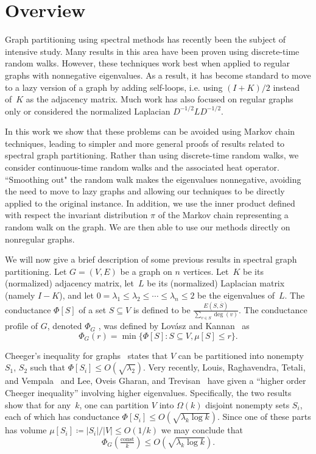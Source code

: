 \documentclass[11pt]{article}
\newcommand{\Bdry}{\Phi}
\begin{document}
\section{Overview}

Graph partitioning using spectral methods has recently been the subject of intensive study.  Many results in this area have been proven using discrete-time random walks.  However, these techniques work best when applied to regular graphs with nonnegative eigenvalues.  As a result, it has become standard to move to a lazy version of a graph by adding self-loops, i.e. using $(I + K)/2$ instead of~$K$ as the adjacency matrix.  Much work has also focused on regular graphs only or considered the normalized Laplacian $D^{-1/2}LD^{-1/2}$.

In this work we show that these problems can be avoided using Markov chain techniques, leading to simpler and more general proofs of results related to spectral graph partitioning.  Rather than using discrete-time random walks, we consider continuous-time random walks and the associated heat operator.  ``Smoothing out" the random walk makes the eigenvalues nonnegative, avoiding the need to move to lazy graphs and allowing our techniques to be directly applied to the original instance.  In addition, we use the inner product defined with respect the invariant distribution $\pi$ of the Markov chain representing a random walk on the graph.  We are then able to use our methods directly on nonregular graphs.

We will now give a brief description of some previous results in spectral graph partitioning.  Let $G = (V,E)$ be a graph on $n$ vertices.  Let~$K$ be its (normalized) adjacency matrix, let~$L$ be its (normalized) Laplacian matrix (namely $I - K$), and let $0 = \lambda_1 \leq \lambda_2 \leq \cdots \leq \lambda_n \leq 2$ be the eigenvalues of~$L$.  The conductance $\Bdry[S]$ of a set $S \subseteq V$ is defined to be $\frac{E(S, \overline{S})}{\sum_{v \in S}\deg(v)}$.  The conductance profile of $G$, denoted  $\Phi_G$ , was defined by Lov\'{a}sz and Kannan~\cite{LK99} as
\[
    \Phi_G(r) = \min \{ \Bdry[S] :  S \subseteq V, \mu[S] \leq r\}.
\]

Cheeger's inequality for graphs~\cite{AM85,Alo86,SJ89} states that $V$ can be partitioned into nonempty $S_1$, $S_2$ such that $\Bdry[S_i] \leq O(\sqrt{\lambda_2})$.  Very recently, Louis, Raghavendra, Tetali, and Vempala~\cite{LRTV12} and Lee, Oveis Gharan, and Trevisan~\cite{LOT12}  have given a ``higher order Cheeger inequality'' involving higher eigenvalues.  Specifically, the two results show that for any~$k$, one can partition $V$ into $\Omega(k)$ disjoint nonempty sets $S_i$, each of which has conductance $\Bdry[S_i] \leq O(\sqrt{\lambda_k \log k})$.  Since one of these parts has volume $\mu[S_i] \coloneqq |S_i|/|V| \leq O(1/k)$ we may conclude that
\begin{equation} \label{eqn:LOT}
    \Phi_G(\tfrac{\text{const}}{k}) \leq O(\sqrt{\lambda_k \log k}).
\end{equation}
\end{document}
